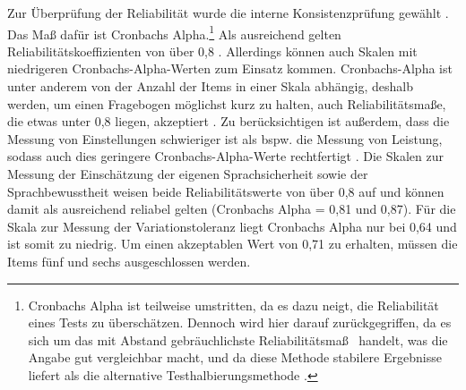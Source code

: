 Zur Überprüfung der Reliabilität wurde die interne Konsistenzprüfung gewählt \citep[s.][467--469]{Doring2016}. 
Das Maß dafür ist Cronbachs Alpha.\footnote{Cronbachs Alpha ist teilweise umstritten, da es dazu neigt, die Reliabilität eines Tests zu überschätzen. Dennoch wird hier darauf zurückgegriffen, da es sich um \glqq das mit Abstand gebräuchlichste Reliabilitätsmaß\grqq{}~\citep[444]{Doring2016} handelt, was die Angabe gut vergleichbar macht, und da diese Methode stabilere Ergebnisse liefert als die alternative Testhalbierungsmethode \citep[s.][467]{Doring2016}.} 
Als ausreichend gelten Reliabilitätskoeffizienten von über 0,8 \citep[s.][443]{Doring2016}. 
Allerdings können auch Skalen mit niedrigeren Cronbachs-Alpha-Werten zum Einsatz kommen. 
Cronbachs-Alpha ist unter anderem von der Anzahl der Items in einer Skala abhängig, deshalb werden, um einen Fragebogen möglichst kurz zu halten, auch Reliabilitätsmaße, die etwas unter 0,8 liegen, akzeptiert \citep[s.][444]{Doring2016}. 
Zu berücksichtigen ist außerdem, dass die Messung von Einstellungen schwieriger ist als bspw. die Messung von Leistung, sodass auch dies geringere Cronbachs-Alpha-Werte rechtfertigt \citep[s.][444]{Doring2016}. 
Die Skalen zur Messung der Einschätzung der eigenen Sprachsicherheit sowie der Sprachbewusstheit weisen beide Reliabilitätswerte von über 0,8 auf und können damit als ausreichend reliabel gelten (Cronbachs Alpha = 0,81 und 0,87). 
Für die Skala zur Messung der Variationstoleranz liegt Cronbachs Alpha nur bei 0,64 und ist somit zu niedrig. 
Um einen akzeptablen Wert von 0,71 zu erhalten, müssen die Items fünf und sechs ausgeschlossen werden. 

